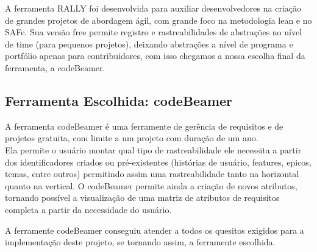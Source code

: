 		A ferramenta RALLY foi desenvolvida para auxiliar desenvolvedores na criação de grandes projetos de abordagem ágil, com grande foco na metodologia lean e no SAFe. Sua versão free permite registro e rastreabilidades de abstrações no nível de time (para pequenos projetos), deixando abstrações a nível de programa e portfólio apenas para contribuidores, com isso chegamos a nossa escolha final da ferramenta, a codeBeamer.

	\subsection{Ferramenta Escolhida: codeBeamer}
		A ferramenta codeBeamer é uma ferramente de gerência de requisitos e de projetos gratuita, com limite a um projeto com duração de um ano.
		\\Ela permite o usuário montar qual tipo de rastreabilidade ele necessita a partir dos identificadores criados ou pré-existentes (histórias de usuário, features, epicos, temas, entre outros) permitindo assim uma rastreabilidade tanto na horizontal quanto na vertical.
		O codeBeamer permite ainda a criação de novos atributos, tornando possível a visualização de uma matriz de atributos de requisitos completa a partir da necessidade do usuário.
		\par A ferramente codeBeamer conseguiu atender a todos os quesitos exigidos para a implementação deste projeto, se tornando assim, a ferramente escolhida.
